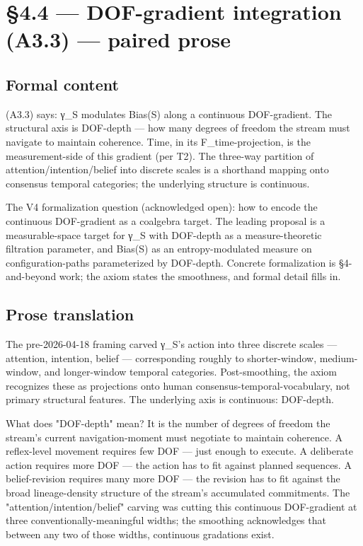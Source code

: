 \documentclass[11pt, openany]{book}
\newcommand{\sectionbreak}{\clearpage}
\begin{document}
\sectionbreak

\section{§4.4 --- DOF-gradient integration (A3.3) --- paired prose}

\subsection{Formal content}

(A3.3) says: γ\_\allowbreak{}S modulates Bias(S) along a continuous DOF-gradient. The structural axis is DOF-depth --- how many degrees of freedom the stream must navigate to maintain coherence. Time, in its F\_\allowbreak{}time-projection, is the measurement-side of this gradient (per T2). The three-way partition of attention/intention/belief into discrete scales is a shorthand mapping onto consensus temporal categories; the underlying structure is continuous.

The V4 formalization question (acknowledged open): how to encode the continuous DOF-gradient as a coalgebra target. The leading proposal is a measurable-space target for γ\_\allowbreak{}S with DOF-depth as a measure-theoretic filtration parameter, and Bias(S) as an entropy-modulated measure on configuration-paths parameterized by DOF-depth. Concrete formalization is §4-and-beyond work; the axiom states the smoothness, and formal detail fills in.

\subsection{Prose translation}

The pre-2026-04-18 framing carved γ\_\allowbreak{}S's action into three discrete scales --- attention, intention, belief --- corresponding roughly to shorter-window, medium-window, and longer-window temporal categories. Post-smoothing, the axiom recognizes these as projections onto human consensus-temporal-vocabulary, not primary structural features. The underlying axis is continuous: DOF-depth.

What does "DOF-depth" mean? It is the number of degrees of freedom the stream's current navigation-moment must negotiate to maintain coherence. A reflex-level movement requires few DOF --- just enough to execute. A deliberate action requires more DOF --- the action has to fit against planned sequences. A belief-revision requires many more DOF --- the revision has to fit against the broad lineage-density structure of the stream's accumulated commitments. The "attention/intention/belief" carving was cutting this continuous DOF-gradient at three conventionally-meaningful widths; the smoothing acknowledges that between any two of those widths, continuous gradations exist.
\end{document}
